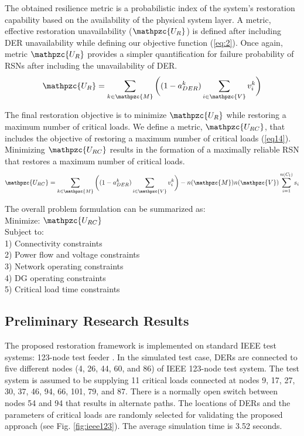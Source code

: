 \documentclass[12pt]{article}
\begin{document}
The obtained resilience metric is a probabilistic index of the system's restoration capability based on the availability of the physical system layer. A metric, effective restoration unavailability ($\mathpzc{U_R}$) is defined after including DER unavailability while defining our objective function (\ref{eq:2}). Once again, metric $\mathpzc{U_R}$ provides a simpler quantification for failure probability of RSNs after including the unavailability of DER.
\begin{equation}\label{eq:2}
    \mathpzc{U_R}=\sum_{k\in \mathpzc{M}}^{}\bigg((1- a_{DER}^k)\sum_{i\in\mathpzc{V}}^{}v_i^k \bigg)
\end{equation}

The final restoration objective is to minimize $\mathpzc{U_R}$ while restoring a maximum number of critical loads. We define a metric, $\mathpzc{U_{RC}}$, that includes the objective of restoring a maximum number of critical loads (\ref{eq14}). Minimizing $\mathpzc{U_{RC}}$ results in the formation of a maximally reliable RSN that restores a maximum number of critical loads.
	\begin{equation}\label{eq14}
	\small
	\mathpzc{U_{RC}} = \sum_{k\in \mathpzc{M}}^{}\bigg((1- a_{DER}^k)\sum_{i\in\mathpzc{V}}^{}v_i^k \bigg)-n(\mathpzc{M})n(\mathpzc{V})\sum_{i=1}^{n(C_l)}s_i
	\end{equation}
	
	The overall problem formulation can be summarized as:\\
\newcommand\tab[1][0.5cm]{\hspace*{#1}}
	\tab Minimize: $\mathpzc{U_{RC}}$ \\
	\tab Subject to:\\
	\tab \tab1) Connectivity constraints\\
	\tab \tab2) Power flow and voltage constraints\\
	\tab \tab3) Network operating constraints\\
	\tab \tab4) DG operating constraints\\
	\tab \tab5) Critical load time constraints\\
	
\subsection{Preliminary Research Results}
The proposed restoration framework is implemented on standard IEEE test systems: 123-node test feeder \cite{ieee123}. In the simulated test case, DERs are connected to five different nodes (4, 26, 44, 60, and 86) of IEEE 123-node test system. The test system is assumed to be supplying 11 critical loads connected at nodes 9, 17, 27, 30, 37, 46, 94, 66, 101, 79, and 87. There is a normally open switch between nodes 54 and 94 that results in alternate paths. The locations of DERs and the parameters of critical loads are randomly selected for validating the proposed approach (see Fig. \ref{fig:ieee123}). The average simulation time is 3.52 seconds.
\end{document}
